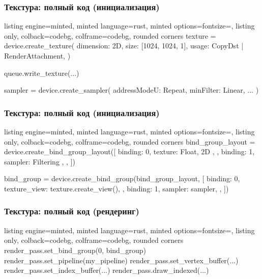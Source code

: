 \documentclass[10pt]{beamer}
\begin{document}
\begin{frame}[fragile]
\frametitle{Текстура: полный код (инициализация)}
\begin{tcblisting}{listing engine=minted, minted language=rust, minted options={fontsize=\scriptsize}, listing only, colback=codebg, colframe=codebg, rounded corners}
texture = device.create_texture({
  dimension: 2D,
  size: [1024, 1024, 1],
  usage: CopyDst | RenderAttachment,
})

queue.write_texture(...)

sampler = device.create_sampler({
  addressModeU: Repeat,
  minFilter: Linear,
  ...
})
\end{tcblisting}
\end{frame}

\begin{frame}[fragile]
\frametitle{Текстура: полный код (инициализация)}
\begin{tcblisting}{listing engine=minted, minted language=rust, minted options={fontsize=\scriptsize}, listing only, colback=codebg, colframe=codebg, rounded corners}
bind_group_layout = device.create_bind_group_layout([
  {
    binding: 0,
    texture: { Float, 2D },
  },
  {
    binding: 1,
    sampler: { Filtering },
  },
])

bind_group = device.create_bind_group(bind_group_layout, [
  {
    binding: 0,
    texture_view: texture.create_view(),
  },
  {
    binding: 1,
    sampler: sampler,
  },
])
\end{tcblisting}
\end{frame}

\begin{frame}[fragile]
\frametitle{Текстура: полный код (рендеринг)}
\begin{tcblisting}{listing engine=minted, minted language=rust, minted options={fontsize=\scriptsize}, listing only, colback=codebg, colframe=codebg, rounded corners}
render_pass.set_bind_group(0, bind_group)
render_pass.set_pipeline(my_pipeline)
render_pass.set_vertex_buffer(...)
render_pass.set_index_buffer(...)
render_pass.draw_indexed(...)
\end{tcblisting}
\end{frame}
\end{document}
